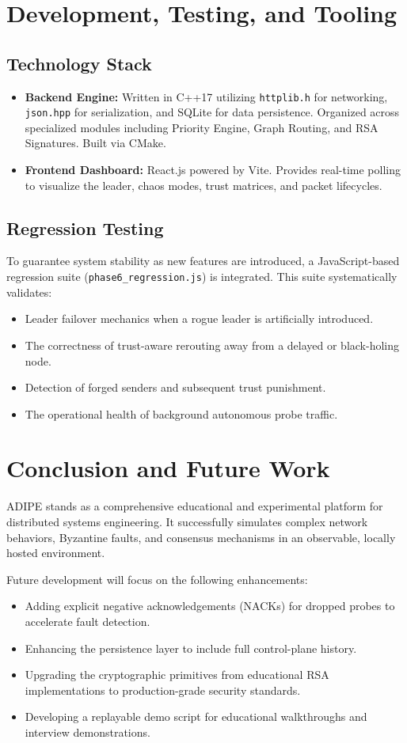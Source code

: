 \documentclass[12pt]{article}
\begin{document}
\section{Development, Testing, and Tooling}

\subsection{Technology Stack}
\begin{itemize}
    \item \textbf{Backend Engine:} Written in C++17 utilizing \texttt{httplib.h} for networking, \texttt{json.hpp} for serialization, and SQLite for data persistence. Organized across specialized modules including Priority Engine, Graph Routing, and RSA Signatures. Built via CMake.
    \item \textbf{Frontend Dashboard:} React.js powered by Vite. Provides real-time polling to visualize the leader, chaos modes, trust matrices, and packet lifecycles.
\end{itemize}

\subsection{Regression Testing}
To guarantee system stability as new features are introduced, a JavaScript-based regression suite (\texttt{phase6\_regression.js}) is integrated. This suite systematically validates:
\begin{itemize}
    \item Leader failover mechanics when a rogue leader is artificially introduced.
    \item The correctness of trust-aware rerouting away from a delayed or black-holing node.
    \item Detection of forged senders and subsequent trust punishment.
    \item The operational health of background autonomous probe traffic.
\end{itemize}

\section{Conclusion and Future Work}
ADIPE stands as a comprehensive educational and experimental platform for distributed systems engineering. It successfully simulates complex network behaviors, Byzantine faults, and consensus mechanisms in an observable, locally hosted environment. 

Future development will focus on the following enhancements:
\begin{itemize}
    \item Adding explicit negative acknowledgements (NACKs) for dropped probes to accelerate fault detection.
    \item Enhancing the persistence layer to include full control-plane history.
    \item Upgrading the cryptographic primitives from educational RSA implementations to production-grade security standards.
    \item Developing a replayable demo script for educational walkthroughs and interview demonstrations.
\end{itemize}
\end{document}
